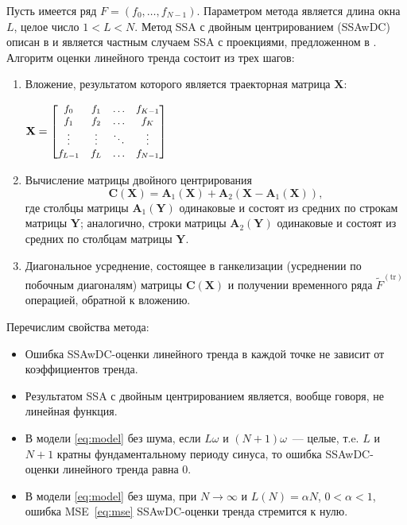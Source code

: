 \documentclass{spisok-article}
\begin{document}
Пусть имеется ряд $F=(f_0,\dots,f_{N-1})$. Параметром метода является длина окна $L$, целое число $1<L<N$.
Метод SSA с двойным центрированием (SSAwDC) описан в \cite{Golyandina.etal2001} и является частным случаем
SSA с проекциями, предложенном в \cite{Golyandina.Shlemov2015}.
Алгоритм оценки линейного тренда состоит из трех шагов:
\begin{enumerate}
\item Вложение, результатом которого является траекторная матрица
$\mathbf{X}$:
\begin{center}
$\mathbf{X}=
\begin{small}
\begin{bmatrix}
f_0&f_1&\ldots&f_{K-1}\\
f_1&f_2&\ldots&f_{K}\\
\vdots&\vdots&\ddots&\vdots\\
f_{L-1}&f_{L}&\ldots&f_{N-1}\\
\end{bmatrix}
\end{small}$
\end{center}
\vspace{0.2cm}

\item Вычисление матрицы двойного центрирования
$$
\mathbf{C}(\mathbf{X}) =
\mathbf{A}_1(\mathbf{X}) + \mathbf{A}_2(\mathbf{X} - \mathbf{A}_1(\mathbf{X})),
$$
где столбцы матрицы $\mathbf{A}_1(\mathbf{Y})$ одинаковые и
состоят из средних по строкам матрицы $\mathbf{Y}$; аналогично, строки матрицы $\mathbf{A}_2(\mathbf{Y})$ одинаковые и
состоят из средних по столбцам матрицы $\mathbf{Y}$.

\item Диагональное усреднение, состоящее в ганкелизации (усреднении по побочным диагоналям) матрицы $\mathbf{C}(\mathbf{X})$
и получении временного ряда $\widetilde{F}^\mathrm{(tr)}$ операцией, обратной к вложению.
\end{enumerate}

Перечислим свойства метода:
\begin{itemize}
\item
Ошибка SSAwDC-оценки линейного тренда в каждой точке не зависит от коэффициентов тренда.
\item
Результатом SSA с двойным центрированием является, вообще говоря, не линейная функция.
\item
В модели \eqref{eq:model} без шума, если $L\omega$ и $(N+1)\omega$~--- целые, т.e. $L$ и $N+1$ кратны фундаментальному периоду синуса, то
ошибка SSAwDC-оценки линейного тренда равна 0.
\item
В модели \eqref{eq:model} без шума, при $N\rightarrow\infty$ и $L(N)=\alpha N$, $0<\alpha<1$,
ошибка MSE~\eqref{eq:mse} SSAwDC-оценки тренда стремится к нулю.
\end{itemize}
\end{document}
